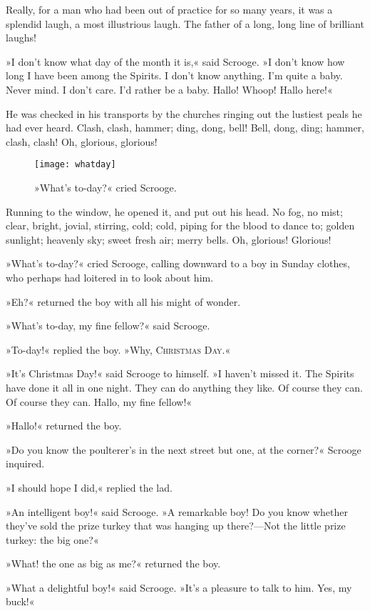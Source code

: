 Really, for a man who had been out of practice for so many years, it was a splendid laugh, a most illustrious laugh. The father of a long, long line of brilliant laughs!

»I don't know what day of the month it is,« said Scrooge. »I don't know how long I have been among the Spirits. I don't know anything. I'm quite a baby. Never mind. I don't care. I'd rather be a baby. Hallo! Whoop! Hallo here!«

He was checked in his transports by the churches ringing out the lustiest peals he had ever heard. Clash, clash, hammer; ding, dong, bell! Bell, dong, ding; hammer, clash, clash! Oh, glorious, glorious!

\begin{figure}[tbh]
\centering
\texttt{[image: whatday]}
\caption{»What's to-day?« cried Scrooge.}
\end{figure}

Running to the window, he opened it, and put out his head. No fog, no mist; clear, bright, jovial, stirring, cold; cold, piping for the blood to dance to; golden sunlight; heavenly sky; sweet fresh air; merry bells. Oh, glorious! Glorious!

»What's to-day?« cried Scrooge, calling downward to a boy in Sunday clothes, who perhaps had loitered in to look about him.

»Eh?« returned the boy with all his might of wonder.

»What's to-day, my fine fellow?« said Scrooge.

»To-day!« replied the boy. »Why, \textsc{Christmas Day.}«

»It's Christmas Day!« said Scrooge to himself. »I haven't missed it. The Spirits have done it all in one night. They can do anything they like. Of course they can. Of course they can. Hallo, my fine fellow!«

»Hallo!« returned the boy.

»Do you know the poulterer's in the next street but one, at the corner?« Scrooge inquired.

»I should hope I did,« replied the lad.

»An intelligent boy!« said Scrooge. »A remarkable boy! Do you know whether they've sold the prize turkey that was hanging up there?---Not the little prize turkey: the big one?«

»What! the one as big as me?« returned the boy.

»What a delightful boy!« said Scrooge. »It's a pleasure to talk to him. Yes, my buck!«

